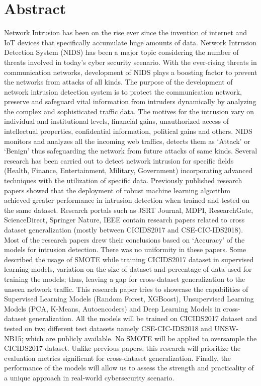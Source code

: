 \chapter*{Abstract}	
Network Intrusion has been on the rise ever since the invention of internet and IoT devices that specifically accumulate huge amounts of data. 
Network Intrusion Detection System (NIDS) has been a major topic considering the number of threats involved in today’s cyber security scenario. 
With the ever-rising threats in communication networks, development of NIDS plays a boosting factor to prevent the networks from attacks of all kinds. 
The purpose of the development of network intrusion detection system is to protect the communication network, preserve and safeguard vital information 
from intruders dynamically by analyzing the complex and sophisticated traffic data. The motives for the intrusion vary on individual and institutional 
levels, financial gains, unauthorized access of intellectual properties, confidential information, political gains and others. NIDS monitors and analyzes 
all the incoming web traffics, detects them as ‘Attack’ or ‘Benign’ thus safeguarding the network from future attacks of same kinds. Several research has 
been carried out to detect network intrusion for specific fields (Health, Finance, Entertainment, Military, Government) incorporating advanced techniques 
with the utilization of specific data. Previously published research papers showed that the deployment of robust machine learning algorithm achieved greater 
performance in intrusion detection when trained and tested on the same dataset. Research portals such as JSRT Journal, MDPI, ResearchGate, ScienceDirect, 
Springer Nature, IEEE contain research papers related to cross dataset generalization (mostly between CICIDS2017 and CSE-CIC-IDS2018). Most of the research 
papers drew their conclusions based on ‘Accuracy’ of the models for intrusion detection. There was no uniformity in these papers. Some described the usage of 
SMOTE while training CICIDS2017 dataset in supervised learning models, variation on the size of dataset and percentage of data used for training the models; 
thus, leaving a gap for cross-dataset generalization to the unseen network traffic. This research paper tries to showcase the capabilities of Supervised Learning 
Models (Random Forest, XGBoost), Unsupervised Learning Models (PCA, K-Means, Autoencoders) and Deep Learning Models in cross-dataset generalization. All the models 
will be trained on CICIDS2017 dataset and tested on two different test datasets namely CSE-CIC-IDS2018 and UNSW-NB15; which are publicly available. No SMOTE will be 
applied to oversample the CICIDS2017 dataset. Unlike previous papers, this research will prioritize the evaluation metrics significant for cross-dataset generalization. 
Finally, the performance of the models will allow us to assess the strength and practicality of a unique approach in real-world cybersecurity scenario.